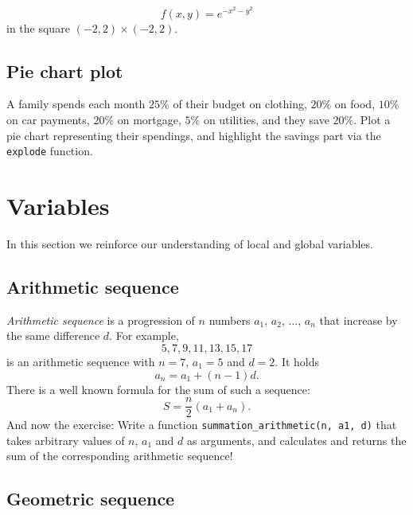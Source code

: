 $$
f(x, y) = e^{-x^2 - y^2}
$$
in the square $(-2, 2)\times (-2, 2)$.


\subsection{Pie chart plot}

A family spends each month $25 \%$ of their budget on clothing,
$20\%$ on food, $10\%$ on car payments, $20 \%$ on mortgage,
$5 \%$ on utilities, and they save $20 \%$. Plot a pie chart 
representing their spendings, and highlight the savings part via 
the {\tt explode} function.


\section{Variables}

In this section we reinforce our understanding of local and global variables.


\subsection{Arithmetic sequence}

{\em Arithmetic sequence} is a progression of $n$ numbers $a_1$, $a_2$, $\ldots$, $a_n$
that increase by the same difference $d$. For example, 
$$
5, 7, 9, 11, 13, 15, 17
$$
is an arithmetic sequence with $n = 7$, $a_1 = 5$ and $d = 2$. It holds
$$
a_n = a_1 + (n-1)d.
$$
There is a well known formula for the sum of such a sequence:
$$
S = \frac{n}{2}(a_1 + a_n).
$$
And now the exercise: Write a function {\tt summation\_arithmetic(n, a1, d)} that takes arbitrary 
values of $n$, $a_1$ and $d$ as arguments, and calculates and returns the sum
of the corresponding arithmetic sequence!


\subsection{Geometric sequence}

